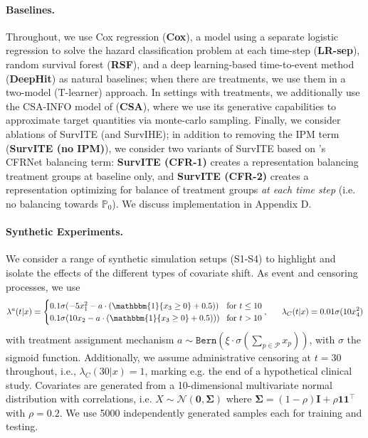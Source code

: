 \documentclass{article}
\newcommand{\Iv}{{\mathbf I}}
\newcommand{\Norm}{{\mathcal{N}}}
\begin{document}
\paragraph{Baselines.} 
Throughout, we use Cox regression (\textbf{Cox}), a model using a separate logistic regression to solve the hazard classification problem at each time-step (\textbf{LR-sep}), random survival forest (\textbf{RSF}), { and a deep learning-based time-to-event method \cite{Changhee:AAAI18} (\textbf{DeepHit})} as natural baselines; when there are treatments, we use them in a two-model (T-learner) approach. In settings with treatments, we additionally use the CSA-INFO model of \cite{chapfuwa2021enabling} (\textbf{CSA}), where we use its generative capabilities to approximate target quantities via monte-carlo sampling. Finally, we consider ablations of SurvITE (and SurvIHE); in addition to removing the IPM term (\textbf{SurvITE (no IPM)}), we consider two variants of SurvITE based on \cite{Shalit:16}'s CFRNet balancing term: \textbf{SurvITE (CFR-1)} creates a representation balancing treatment groups at baseline only, and \textbf{SurvITE (CFR-2)} creates a representation optimizing for balance of treatment groups \textit{at each time step} (i.e. no balancing towards $\mathbb{P}_0$). We discuss implementation in Appendix D.


\paragraph{Synthetic Experiments.}
We consider a range of synthetic simulation setups (S1-S4) to  highlight and isolate the effects of the different types of covariate shift. As event and censoring processes, we use
\begin{equation*}
    \lambda^a(t|x) =
        \begin{cases}
        0.1\sigma(-5x_{1}^{2} - a\cdot(\mathbbm{1}\{x_3\geq 0\}+0.5))&\!\text{for}~t \leq 10\\
        0.1\sigma(10x_{2}  - a\cdot(\mathbbm{1}\{x_3\geq 0\}+0.5)))&\!\text{for}~t > 10 
        \end{cases},~~~~~\lambda_{C}(t|x) =  0.01\sigma(10x_{4}^{2})
\end{equation*}
with treatment assignment mechanism  $a \sim \texttt{Bern}(\xi\cdot\sigma(\sum\nolimits_{p \in \mathcal{P}}x_{p}))$, with $\sigma$ the sigmoid function.   Additionally, we assume administrative censoring at $t=30$ throughout, i.e., $\lambda_{C}(30|x) = 1$, marking e.g. the end of a hypothetical clinical study. Covariates are generated from a 10-dimensional multivariate normal distribution with correlations, i.e. $X \sim \Norm(\textbf{0},\bm{\Sigma})$ where $\bm{\Sigma} = (1-\rho) \Iv + \rho \textbf{1}\textbf{1}^{\top}$ with $\rho = 0.2$. We use 5000 independently generated samples each for training and testing.
\end{document}
